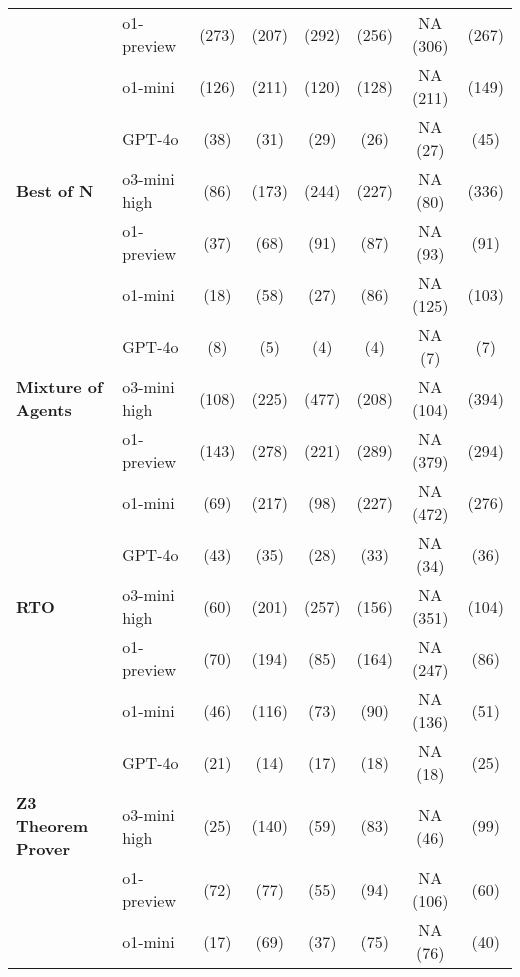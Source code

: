 \begin{table}[H]
\begin{tabular}{llcccccc}
& o1-preview & \C (273) & \X (207) & \X (292) & \X (256) & NA (306) & \X (267) \\
& o1-mini & \C (126) & \X (211) & \X (120) & \X (128) & NA (211) & \X (149) \\
& GPT-4o & \X (38) & \X (31) & \X (29) & \X (26) & NA (27) & \X (45) \\
\midrule
\textbf{Best of N} 
& o3-mini high & \C (86) & \C (173) & \X (244) & \X (227) & NA (80) & \X (336)\\
& o1-preview & \C (37) & \X (68) & \X (91) & \X (87) & NA (93) & \X (91) \\
& o1-mini & \C (18) & \X (58) & \X (27) & \X (86) & NA (125) & \X (103) \\
& GPT-4o & \X (8) & \X (5) & \X (4) & \X (4) & NA (7) & \X (7) \\
\midrule
\textbf{Mixture of Agents} 
& o3-mini high & \C (108) & \X (225) & \X (477) & \X (208) & NA (104) &  \X (394) \\
& o1-preview & \C (143) & \X (278) & \X (221) & \X (289) & NA (379) & \X (294) \\
& o1-mini & \C (69) & \X (217) & \X (98) & \X (227) & NA (472) & \X (276) \\
& GPT-4o & \X (43) & \X (35) & \X (28) & \X (33) & NA (34) & \X (36) \\
\midrule
\textbf{RTO} 
& o3-mini high & \X (60) & \X (201) & \X (257) & \X (156) & NA (351) & \X (104) \\
& o1-preview & \X (70) & \X (194) & \X (85) & \X (164) & NA (247) & \F (86) \\
& o1-mini & \X (46) & \X (116) & \X (73) & \X (90) & NA (136) & \X (51) \\
& GPT-4o & \C (21) & \X (14) & \X (17) & \X (18) & NA (18) & \X (25) \\
\midrule
\textbf{Z3 Theorem Prover} 
& o3-mini high & \C (25) & \X (140) & \X (59) & \X (83) & NA (46) & \X (99) \\
& o1-preview & \C (72) & \X (77) & \X (55) & \C (94) & NA (106) & \X (60) \\
& o1-mini & \C (17) & \X (69) & \X (37) & \X (75) & NA (76) & \X (40) \\ 

\end{tabular}
\end{table}
